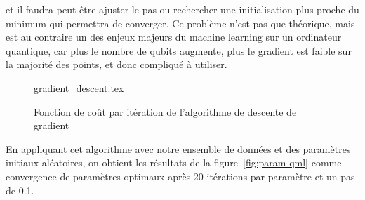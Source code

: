 et il faudra peut-être ajuster le pas ou rechercher une initialisation plus proche du minimum
qui permettra de converger.
Ce problème n'est pas que théorique, mais est au contraire un des enjeux majeurs du machine
learning sur un ordinateur quantique, car plus le nombre de qubits augmente, plus le gradient
est faible sur la majorité des points, et donc compliqué à utiliser.
\begin{figure}[H]
    \centering
    {gradient_descent.tex}
    \caption{Fonction de coût par itération de l'algorithme de descente de gradient}
    \label{fig:gradient_descent}
\end{figure}
En appliquant cet algorithme avec notre ensemble de données et des paramètres initiaux
aléatoires, on obtient les résultats de la figure~\ref{fig:param-qml} comme convergence
de paramètres optimaux après 20 itérations par paramètre et un pas de 0.1.
